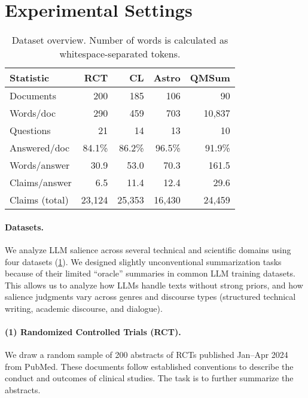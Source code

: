 \section{Experimental Settings}
\label{sec:experimental-settings}

\begin{table}[t]
\small
\centering
\setlength{\tabcolsep}{4pt}
\begin{tabular}{lrrrr}
\toprule
\textbf{Statistic} & \textbf{RCT} & \textbf{CL} & \textbf{Astro} & \textbf{QMSum} \\
\midrule
Documents & 200 & 185 & 106 & 90 \\
Words/doc & 290 & 459 & 703 & 10,837 \\
\midrule
Questions & 21 & 14 & 13 & 10 \\
Answered/doc & 84.1\% & 86.2\% & 96.5\% & 91.9\% \\
Words/answer & 30.9 & 53.0 & 70.3 & 161.5 \\
Claims/answer & 6.5 & 11.4 & 12.4 & 29.6 \\
Claims (total) & 23,124 & 25,353 & 16,430 & 24,459 \\
\bottomrule
\end{tabular}

\caption{Dataset overview. Number of words is calculated as whitespace-separated tokens.}
\label{tab:dataset-statistics}

\end{table}

\paragraph{Datasets.}
We analyze LLM salience across several technical and scientific domains using four datasets (\cref{tab:dataset-statistics}).
We designed slightly unconventional summarization tasks because of their limited ``oracle'' summaries in common LLM training datasets.
This allows us to analyze how LLMs handle texts without strong priors, and how salience judgments vary across genres and discourse types (structured technical writing, academic discourse, and dialogue).

\paragraph{(1) Randomized Controlled Trials (RCT).}
We draw a random sample of 200 abstracts of RCTs published Jan--Apr 2024 from PubMed.
These documents follow established conventions to describe the conduct and outcomes of clinical studies.
The task is to further summarize the abstracts.


